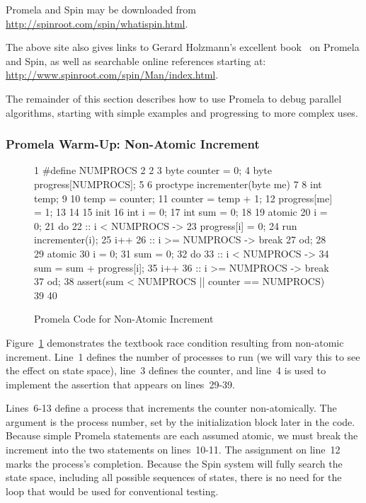 Promela and Spin may be downloaded from
\url{http://spinroot.com/spin/whatispin.html}.

The above site also gives links to Gerard Holzmann's excellent
book~\cite{Holzmann03a} on Promela and Spin,
as well as searchable online references starting at:
\url{http://www.spinroot.com/spin/Man/index.html}.

The remainder of this section describes how to use Promela to debug
parallel algorithms, starting with simple examples and progressing to
more complex uses.

\subsubsection{Promela Warm-Up: Non-Atomic Increment}
\label{sec:formal:Promela Warm-Up: Non-Atomic Increment}

\begin{figure}[tbp]
{ \scriptsize
\begin{verbbox}
  1 #define NUMPROCS 2
  2
  3 byte counter = 0;
  4 byte progress[NUMPROCS];
  5
  6 proctype incrementer(byte me)
  7 {
  8   int temp;
  9
 10   temp = counter;
 11   counter = temp + 1;
 12   progress[me] = 1;
 13 }
 14
 15 init {
 16   int i = 0;
 17   int sum = 0;
 18
 19   atomic {
 20     i = 0;
 21     do
 22     :: i < NUMPROCS ->
 23       progress[i] = 0;
 24       run incrementer(i);
 25       i++
 26     :: i >= NUMPROCS -> break
 27     od;
 28   }
 29   atomic {
 30     i = 0;
 31     sum = 0;
 32     do
 33     :: i < NUMPROCS ->
 34       sum = sum + progress[i];
 35       i++
 36     :: i >= NUMPROCS -> break
 37     od;
 38     assert(sum < NUMPROCS || counter == NUMPROCS)
 39   }
 40 }
\end{verbbox}
}
\centering
\theverbbox
\caption{Promela Code for Non-Atomic Increment}
\label{fig:analysis:Promela Code for Non-Atomic Increment}
\end{figure}

Figure~\ref{fig:analysis:Promela Code for Non-Atomic Increment}
demonstrates the textbook race condition
resulting from non-atomic increment.
Line~1 defines the number of processes to run (we will vary this
to see the effect on state space), line~3 defines the counter,
and line~4 is used to implement the assertion that appears on
lines~29-39.

Lines~6-13 define a process that increments the counter non-atomically.
The argument  is the process number, set by the initialization
block later in the code.
Because simple Promela statements are each assumed atomic, we must
break the increment into the two statements on lines~10-11.
The assignment on line~12 marks the process's completion.
Because the Spin system will fully search the state space, including
all possible sequences of states, there is no need for the loop
that would be used for conventional testing.

